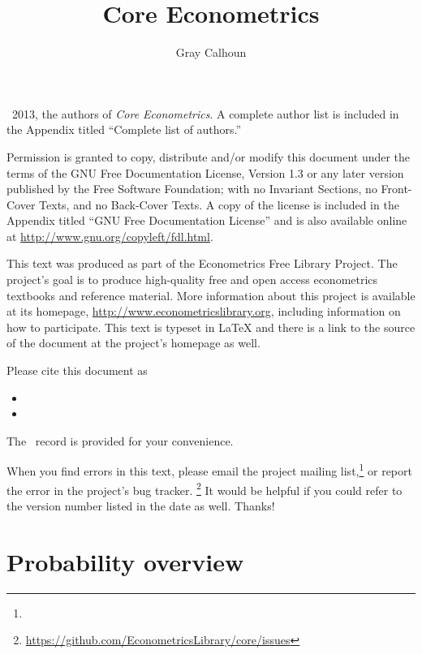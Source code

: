 \documentclass[11pt,notitlepage]{report}
\title{Core Econometrics}
\author{Gray Calhoun}
\begin{document}
\maketitle

\bigskip\noindent%
\textcopyright\ 2013, the authors of \textit{Core Econometrics}.  A
complete author list is included in the Appendix titled ``Complete
list of authors.''

Permission is granted to copy, distribute and/or modify this document
under the terms of the GNU Free Documentation License, Version 1.3 or
any later version published by the Free Software Foundation; with no
Invariant Sections, no Front-Cover Texts, and no Back-Cover Texts.  A
copy of the license is included in the Appendix titled ``GNU Free
Documentation License'' and is also available online at
\url{http://www.gnu.org/copyleft/fdl.html}.

This text was produced as part of the Econometrics Free Library
Project.  The project's goal is to produce high-quality free and
open access econometrics textbooks and reference material.  More
information about this project is available at its homepage,
\url{http://www.econometricslibrary.org}, including information on how
to participate.  This text is typeset in LaTeX and there is a link
to the source of the document at the project's homepage as well.

Please cite this document as
\begin{itemize}
\item[] 
\item[] 
\end{itemize}
The \BibTeX\ record is provided for your convenience.

When you find errors in this text, please email the project mailing
list,\footnote{} or report
the error in the project's bug tracker.%
\footnote{\url{https://github.com/EconometricsLibrary/core/issues}}
It would be helpful if you could refer to the version number listed in
the date as well.  Thanks!

\tableofcontents
{}

\part{Probability overview}


\begin{appendices}

\end{appendices}
\end{document}
